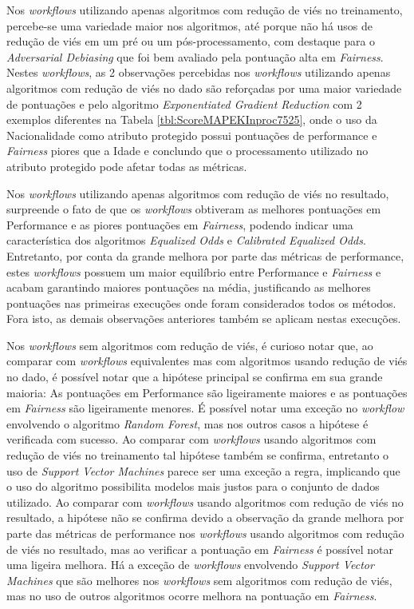 \documentclass[twocolumn]{article}
\begin{document}
Nos \textit{workflows} utilizando apenas algoritmos com redução de viés no treinamento, percebe-se uma variedade maior nos algoritmos, até porque não há usos de redução de viés em um pré ou um pós-processamento, com destaque para o \textit{Adversarial Debiasing} que foi bem avaliado pela pontuação alta em \textit{Fairness}. Nestes \textit{workflows}, as 2 observações percebidas nos \textit{workflows} utilizando apenas algoritmos com redução de viés no dado são reforçadas por uma maior variedade de pontuações e pelo algoritmo \textit{Exponentiated Gradient Reduction} com 2 exemplos diferentes na Tabela \ref{tbl:ScoreMAPEKInproc7525}, onde o uso da Nacionalidade como atributo protegido possui pontuações de performance e \textit{Fairness} piores que a Idade e conclundo que o processamento utilizado no atributo protegido pode afetar todas as métricas.

Nos \textit{workflows} utilizando apenas algoritmos com redução de viés no resultado, surpreende o fato de que os \textit{workflows} obtiveram as melhores pontuações em Performance e as piores pontuações em \textit{Fairness}, podendo indicar uma característica dos algoritmos \textit{Equalized Odds} e \textit{Calibrated Equalized Odds}. Entretanto, por conta da grande melhora por parte das métricas de performance, estes \textit{workflows} possuem um maior equilíbrio entre Performance e \textit{Fairness} e acabam garantindo maiores pontuações na média, justificando as melhores pontuações nas primeiras execuções onde foram considerados todos os métodos. Fora isto, as demais observações anteriores também se aplicam nestas execuções.

Nos \textit{workflows} sem algoritmos com redução de viés, é curioso notar que, ao comparar com \textit{workflows} equivalentes mas com algoritmos usando redução de viés no dado, é possível notar que a hipótese principal se confirma em sua grande maioria: As pontuações em Performance são ligeiramente maiores e as pontuações em \textit{Fairness} são ligeiramente menores. É possível notar uma exceção no \textit{workflow} envolvendo o algoritmo \textit{Random Forest}, mas nos outros casos a hipótese é verificada com sucesso. Ao comparar com \textit{workflows} usando algoritmos com redução de viés no treinamento tal hipótese também se confirma, entretanto o uso de \textit{Support Vector Machines} parece ser uma exceção a regra, implicando que o uso do algoritmo possibilita modelos mais justos para o conjunto de dados utilizado. Ao comparar com \textit{workflows} usando algoritmos com redução de viés no resultado, a hipótese não se confirma devido a observação da grande melhora por parte das métricas de performance nos \textit{workflows} usando algoritmos com redução de viés no resultado, mas ao verificar a pontuação em \textit{Fairness} é possível notar uma ligeira melhora. Há a exceção de \textit{workflows} envolvendo \textit{Support Vector Machines} que são melhores nos \textit{workflows} sem algoritmos com redução de viés, mas no uso de outros algoritmos ocorre melhora na pontuação em \textit{Fairness}.
\end{document}
